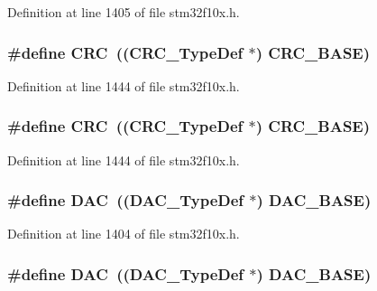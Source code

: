 Definition at line 1405 of file stm32f10x.\+h.

\subsubsection[{\texorpdfstring{C\+RC}{CRC}}]{\setlength{\rightskip}{0pt plus 5cm}\#define C\+RC~(({\bf C\+R\+C\+\_\+\+Type\+Def} $\ast$) {\bf C\+R\+C\+\_\+\+B\+A\+SE})}\hypertarget{group___peripheral__declaration_ga4381bb54c2dbc34500521165aa7b89b1}{}\label{group___peripheral__declaration_ga4381bb54c2dbc34500521165aa7b89b1}


Definition at line 1444 of file stm32f10x.\+h.

\subsubsection[{\texorpdfstring{C\+RC}{CRC}}]{\setlength{\rightskip}{0pt plus 5cm}\#define C\+RC~(({\bf C\+R\+C\+\_\+\+Type\+Def} $\ast$) {\bf C\+R\+C\+\_\+\+B\+A\+SE})}\hypertarget{group___peripheral__declaration_ga4381bb54c2dbc34500521165aa7b89b1}{}\label{group___peripheral__declaration_ga4381bb54c2dbc34500521165aa7b89b1}


Definition at line 1444 of file stm32f10x.\+h.

\subsubsection[{\texorpdfstring{D\+AC}{DAC}}]{\setlength{\rightskip}{0pt plus 5cm}\#define D\+AC~(({\bf D\+A\+C\+\_\+\+Type\+Def} $\ast$) {\bf D\+A\+C\+\_\+\+B\+A\+SE})}\hypertarget{group___peripheral__declaration_ga4aa2a4ab86ce00c23035e5cee2e7fc7e}{}\label{group___peripheral__declaration_ga4aa2a4ab86ce00c23035e5cee2e7fc7e}


Definition at line 1404 of file stm32f10x.\+h.

\subsubsection[{\texorpdfstring{D\+AC}{DAC}}]{\setlength{\rightskip}{0pt plus 5cm}\#define D\+AC~(({\bf D\+A\+C\+\_\+\+Type\+Def} $\ast$) {\bf D\+A\+C\+\_\+\+B\+A\+SE})}\hypertarget{group___peripheral__declaration_ga4aa2a4ab86ce00c23035e5cee2e7fc7e}{}\label{group___peripheral__declaration_ga4aa2a4ab86ce00c23035e5cee2e7fc7e}


